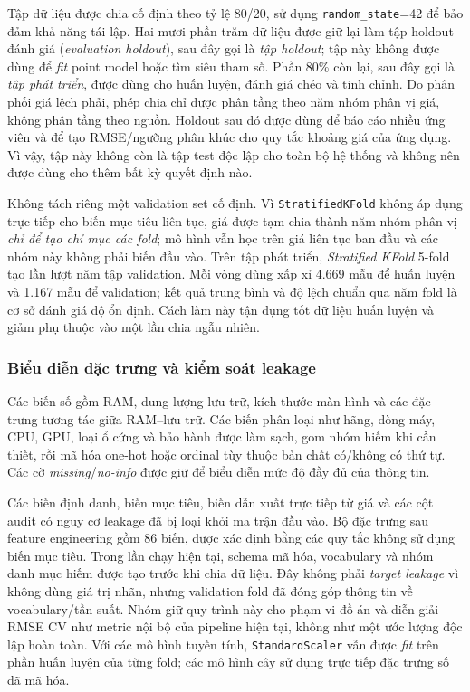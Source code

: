 Tập dữ liệu được chia cố định theo tỷ lệ 80/20, sử dụng \texttt{random\_state}=42 để bảo đảm khả năng tái lập. Hai mươi phần trăm dữ liệu được giữ lại làm tập holdout đánh giá (\textit{evaluation holdout}), sau đây gọi là \textit{tập holdout}; tập này không được dùng để \textit{fit} point model hoặc tìm siêu tham số. Phần 80\% còn lại, sau đây gọi là \textit{tập phát triển}, được dùng cho huấn luyện, đánh giá chéo và tinh chỉnh. Do phân phối giá lệch phải, phép chia chỉ được phân tầng theo năm nhóm phân vị giá, không phân tầng theo nguồn. Holdout sau đó được dùng để báo cáo nhiều ứng viên và để tạo RMSE/ngưỡng phân khúc cho quy tắc khoảng giá của ứng dụng. Vì vậy, tập này không còn là tập test độc lập cho toàn bộ hệ thống và không nên được dùng cho thêm bất kỳ quyết định nào.

Không tách riêng một validation set cố định. Vì \texttt{StratifiedKFold} không áp dụng trực tiếp cho biến mục tiêu liên tục, giá được tạm chia thành năm nhóm phân vị \emph{chỉ để tạo chỉ mục các fold}; mô hình vẫn học trên giá liên tục ban đầu và các nhóm này không phải biến đầu vào. Trên tập phát triển, \textit{Stratified KFold} 5-fold tạo lần lượt năm tập validation. Mỗi vòng dùng xấp xỉ 4.669 mẫu để huấn luyện và 1.167 mẫu để validation; kết quả trung bình và độ lệch chuẩn qua năm fold là cơ sở đánh giá độ ổn định. Cách làm này tận dụng tốt dữ liệu huấn luyện và giảm phụ thuộc vào một lần chia ngẫu nhiên.



\subsubsection{Biểu diễn đặc trưng và kiểm soát leakage}

Các biến số gồm RAM, dung lượng lưu trữ, kích thước màn hình và các đặc trưng tương tác giữa RAM--lưu trữ. Các biến phân loại như hãng, dòng máy, CPU, GPU, loại ổ cứng và bảo hành được làm sạch, gom nhóm hiếm khi cần thiết, rồi mã hóa one-hot hoặc ordinal tùy thuộc bản chất có/không có thứ tự. Các cờ \textit{missing}/\textit{no-info} được giữ để biểu diễn mức độ đầy đủ của thông tin.

Các biến định danh, biến mục tiêu, biến dẫn xuất trực tiếp từ giá và các cột audit có nguy cơ leakage đã bị loại khỏi ma trận đầu vào. Bộ đặc trưng sau feature engineering gồm 86 biến, được xác định bằng các quy tắc không sử dụng biến mục tiêu. Trong lần chạy hiện tại, schema mã hóa, vocabulary và nhóm danh mục hiếm được tạo trước khi chia dữ liệu. Đây không phải \textit{target leakage} vì không dùng giá trị nhãn, nhưng validation fold đã đóng góp thông tin về vocabulary/tần suất. Nhóm giữ quy trình này cho phạm vi đồ án và diễn giải RMSE CV như metric nội bộ của pipeline hiện tại, không như một ước lượng độc lập hoàn toàn. Với các mô hình tuyến tính, \texttt{StandardScaler} vẫn được \textit{fit} trên phần huấn luyện của từng fold; các mô hình cây sử dụng trực tiếp đặc trưng số đã mã hóa.

